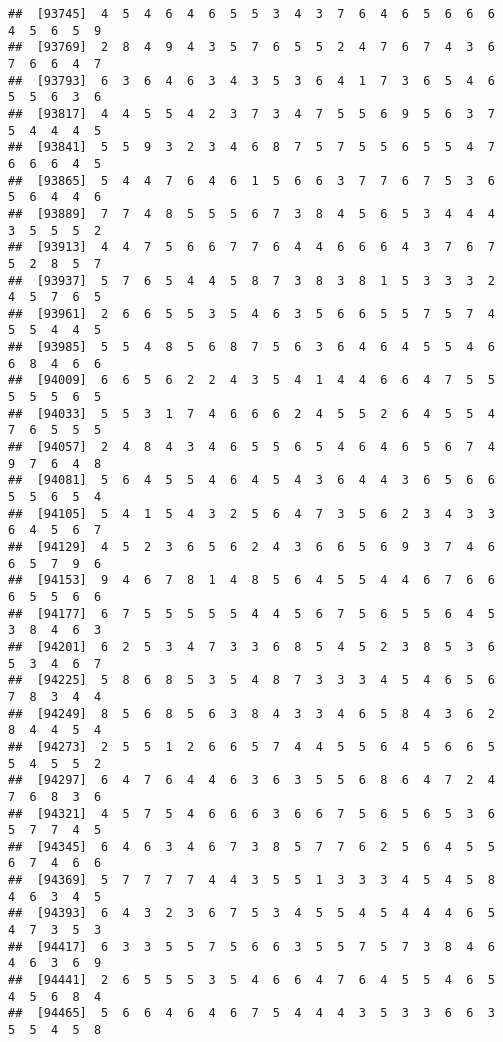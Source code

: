 \documentclass[
]{book}
\begin{document}
\begin{verbatim}
##  [93745]  4  5  4  6  4  6  5  5  3  4  3  7  6  4  6  5  6  6  6  4  5  6  5  9
##  [93769]  2  8  4  9  4  3  5  7  6  5  5  2  4  7  6  7  4  3  6  7  6  6  4  7
##  [93793]  6  3  6  4  6  3  4  3  5  3  6  4  1  7  3  6  5  4  6  5  5  6  3  6
##  [93817]  4  4  5  5  4  2  3  7  3  4  7  5  5  6  9  5  6  3  7  5  4  4  4  5
##  [93841]  5  5  9  3  2  3  4  6  8  7  5  7  5  5  6  5  5  4  7  6  6  6  4  5
##  [93865]  5  4  4  7  6  4  6  1  5  6  6  3  7  7  6  7  5  3  6  5  6  4  4  6
##  [93889]  7  7  4  8  5  5  5  6  7  3  8  4  5  6  5  3  4  4  4  3  5  5  5  2
##  [93913]  4  4  7  5  6  6  7  7  6  4  4  6  6  6  4  3  7  6  7  5  2  8  5  7
##  [93937]  5  7  6  5  4  4  5  8  7  3  8  3  8  1  5  3  3  3  2  4  5  7  6  5
##  [93961]  2  6  6  5  5  3  5  4  6  3  5  6  6  5  5  7  5  7  4  5  5  4  4  5
##  [93985]  5  5  4  8  5  6  8  7  5  6  3  6  4  6  4  5  5  4  6  6  8  4  6  6
##  [94009]  6  6  5  6  2  2  4  3  5  4  1  4  4  6  6  4  7  5  5  5  5  5  6  5
##  [94033]  5  5  3  1  7  4  6  6  6  2  4  5  5  2  6  4  5  5  4  7  6  5  5  5
##  [94057]  2  4  8  4  3  4  6  5  5  6  5  4  6  4  6  5  6  7  4  9  7  6  4  8
##  [94081]  5  6  4  5  5  4  6  4  5  4  3  6  4  4  3  6  5  6  6  5  5  6  5  4
##  [94105]  5  4  1  5  4  3  2  5  6  4  7  3  5  6  2  3  4  3  3  6  4  5  6  7
##  [94129]  4  5  2  3  6  5  6  2  4  3  6  6  5  6  9  3  7  4  6  6  5  7  9  6
##  [94153]  9  4  6  7  8  1  4  8  5  6  4  5  5  4  4  6  7  6  6  6  5  5  6  6
##  [94177]  6  7  5  5  5  5  5  4  4  5  6  7  5  6  5  5  6  4  5  3  8  4  6  3
##  [94201]  6  2  5  3  4  7  3  3  6  8  5  4  5  2  3  8  5  3  6  5  3  4  6  7
##  [94225]  5  8  6  8  5  3  5  4  8  7  3  3  3  4  5  4  6  5  6  7  8  3  4  4
##  [94249]  8  5  6  8  5  6  3  8  4  3  3  4  6  5  8  4  3  6  2  8  4  4  5  4
##  [94273]  2  5  5  1  2  6  6  5  7  4  4  5  5  6  4  5  6  6  5  5  4  5  5  2
##  [94297]  6  4  7  6  4  4  6  3  6  3  5  5  6  8  6  4  7  2  4  7  6  8  3  6
##  [94321]  4  5  7  5  4  6  6  6  3  6  6  7  5  6  5  6  5  3  6  5  7  7  4  5
##  [94345]  6  4  6  3  4  6  7  3  8  5  7  7  6  2  5  6  4  5  5  6  7  4  6  6
##  [94369]  5  7  7  7  7  4  4  3  5  5  1  3  3  3  4  5  4  5  8  4  6  3  4  5
##  [94393]  6  4  3  2  3  6  7  5  3  4  5  5  4  5  4  4  4  6  5  4  7  3  5  3
##  [94417]  6  3  3  5  5  7  5  6  6  3  5  5  7  5  7  3  8  4  6  4  6  3  6  9
##  [94441]  2  6  5  5  5  3  5  4  6  6  4  7  6  4  5  5  4  6  5  4  5  6  8  4
##  [94465]  5  6  6  4  6  4  6  7  5  4  4  4  3  5  3  3  6  6  3  5  5  4  5  8

\end{verbatim}
\end{document}
